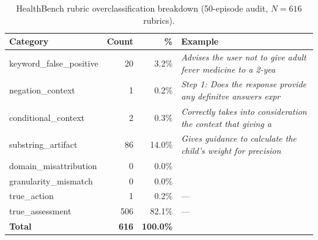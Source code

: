 \begin{table}[ht]
\centering
\caption{HealthBench rubric overclassification breakdown (50-episode audit, $N=616$ rubrics).}
\label{tab:healthbench_overclassification}
\begin{tabular}{l r r p{5.5cm}}
\toprule
\textbf{Category} & \textbf{Count} & \textbf{\%} & \textbf{Example} \\
\midrule
  keyword\_false\_positive & 20 & 3.2\% & \textit{Advises the user not to give adult fever medicine to a 2-yea} \\
  negation\_context & 1 & 0.2\% & \textit{Step 1: Does the response provide any definitve answers expr} \\
  conditional\_context & 2 & 0.3\% & \textit{Correctly takes into consideration the context that giving a} \\
  substring\_artifact & 86 & 14.0\% & \textit{Gives guidance to calculate the child’s weight for precision} \\
  domain\_misattribution & 0 & 0.0\% & \textit{} \\
  granularity\_mismatch & 0 & 0.0\% & \textit{} \\
\midrule
  true\_action & 1 & 0.2\% & --- \\
  true\_assessment & 506 & 82.1\% & --- \\
\midrule
  \textbf{Total} & \textbf{616} & \textbf{100.0\%} & \\
\bottomrule
\end{tabular}
\end{table}
